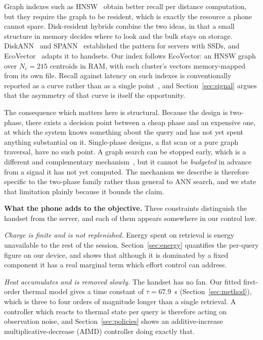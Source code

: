 \documentclass[journal]{IEEEtran}
\begin{document}
Graph indexes such as HNSW~\cite{malkov2020hnsw} obtain better recall per
distance computation, but they require the graph to be resident, which is
exactly the resource a phone cannot spare. Disk-resident hybrids combine
the two ideas, in that a small structure in memory decides where to look
and the bulk stays on storage. DiskANN~\cite{subramanya2019diskann} and
SPANN~\cite{chen2021spann} established the pattern for servers with SSDs,
and EcoVector~\cite{park2025mobilerag} adapts it to handsets. Our index
follows EcoVector: an HNSW graph over $N_c = 215$ centroids in RAM, with
each cluster's vectors memory-mapped from its own file. Recall against
latency on such indexes is conventionally reported as a curve rather than
as a single point~\cite{aumuller2020annbench}, and
Section~\ref{sec:signal} argues that the asymmetry of that curve is itself
the opportunity.

The consequence which matters here is structural. Because the design is
two-phase, there exists a decision point between a cheap phase and an
expensive one, at which the system knows something about the query and has
not yet spent anything substantial on it. Single-phase designs, a flat scan
or a pure graph traversal, have no such point. A graph search can be
stopped early, which is a different and complementary
mechanism~\cite{li2020earlytermination,chatzakis2026darth}, but it cannot
be \emph{budgeted} in advance from a signal it has not yet computed. The
mechanism we describe is therefore specific to the two-phase family rather
than general to ANN search, and we state that limitation plainly because
it bounds the claim.

\textbf{What the phone adds to the objective.} Three constraints
distinguish the handset from the server, and each of them appears somewhere
in our control law.

\emph{Charge is finite and is not replenished.} Energy spent on retrieval
is energy unavailable to the rest of the session. Section~\ref{sec:energy}
quantifies the per-query figure on our device, and shows that although it
is dominated by a fixed component it has a real marginal term which effort
control can address.

\emph{Heat accumulates and is removed slowly.} The handset has no fan. Our
fitted first-order thermal model gives a time constant of $\tau = 67.9$~s
(Section~\ref{sec:method}), which is three to four orders of magnitude
longer than a single retrieval. A controller which reacts to thermal state
per query is therefore acting on observation noise, and
Section~\ref{sec:policies} shows an additive-increase multiplicative-decrease
(AIMD) controller doing exactly that.
\end{document}
